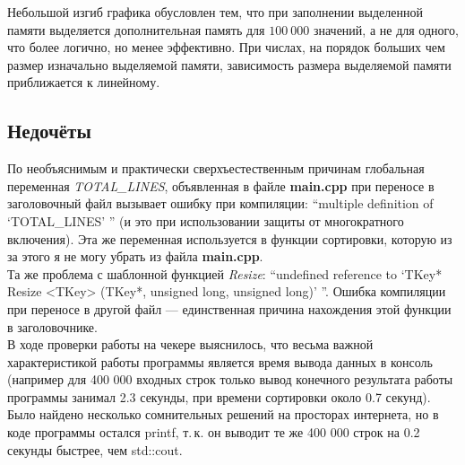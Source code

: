 \documentclass[12pt]{article}
\begin{document}

Небольшой изгиб графика обусловлен тем, что при заполнении выделенной памяти выделяется дополнительная память для $100\ 000$ значений, а не для одного, что более логично, но менее эффективно. При числах, на порядок больших чем размер изначально выделяемой памяти, зависимость размера выделяемой памяти приближается к линейному.




\subsection*{Недочёты}

По необъяснимым и практически сверхъестественным причинам глобальная переменная \textit{TOTAL\_LINES}, объявленная в файле {\bf main.cpp} при переносе в заголовочный файл вызывает ошибку при компиляции: ``multiple definition of `TOTAL\_LINES' '' (и это при использовании защиты от многократного включения).
\smallbreak
 Эта же переменная используется в функции сортировки, которую из за этого я не могу убрать из файла {\bf main.cpp}.\\



Та же проблема с шаблонной функцией {\it Resize}: ``undefined reference to `TKey* Resize <TKey> (TKey*, unsigned long, unsigned long)' ''. \smallbreak
Ошибка компиляции при переносе в другой файл --- единственная причина нахождения этой функции в заголовочнике.\\


В ходе проверки работы на чекере выяснилось, что весьма важной характеристикой работы программы является время вывода данных в консоль (например для 400 000 входных строк только вывод конечного результата работы программы занимал 2.3 секунды, при времени сортировки около 0.7 секунд). Было найдено несколько сомнительных решений на просторах интернета, но в коде программы остался printf, т.\,к. он выводит те же 400 000 строк на 0.2 секунды быстрее, чем std::cout.
\end{document}
